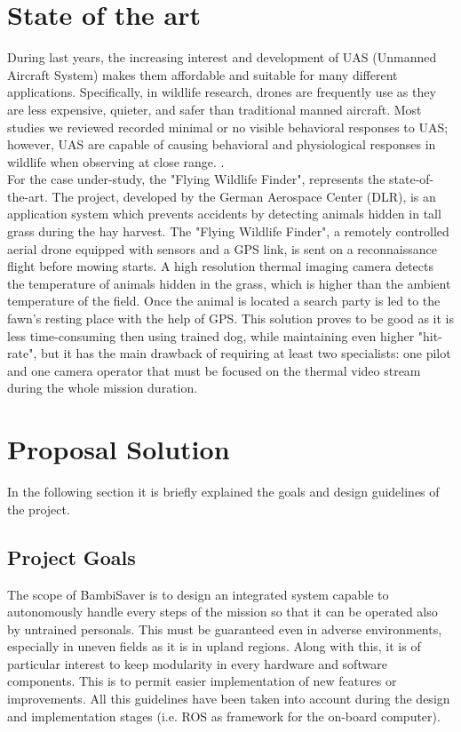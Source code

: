 \section{State of the art} %
\label{sec:state_of_the_art}
 During last years, the increasing interest and development of UAS (Unmanned Aircraft System) makes them affordable and suitable for many different applications. Specifically, in wildlife research, drones are frequently use as they are less expensive, quieter, and safer than traditional manned aircraft. Most studies we reviewed recorded minimal or no visible behavioral responses to UAS; however, UAS are capable of causing behavioral and physiological responses in wildlife when observing at close range. \cite{doi:10.1002/fee.1281}.\\
 For the case under-study, the "Flying Wildlife Finder", represents the state-of-the-art.
 The project, developed by the German Aerospace Center (DLR), is an application system which prevents accidents by detecting animals hidden in tall grass during the hay harvest. 
 The "Flying Wildlife Finder", a remotely controlled aerial drone equipped with sensors and a GPS link, is sent on a reconnaissance flight before mowing starts. A high resolution thermal imaging camera detects the temperature of animals hidden in the grass, which is higher than the ambient temperature of the field. Once the animal is located a search party is led to the fawn’s resting place with the help of GPS.
 This solution proves to be good as it is less time-consuming then using trained dog, while maintaining even higher "hit-rate", but it has the main drawback of requiring at least two specialists: one pilot and one camera operator that must be focused on the thermal video stream during the whole mission duration.

 
 
 \section{Proposal Solution} %
 \label{sec:proposal_solution}
 In the following section it is briefly explained the goals and design guidelines of the project.

 \subsection{Project Goals} %
 \label{sec:bambisaver_goals}
 The scope of BambiSaver is to design an integrated system capable to autonomously handle every steps of the mission so that it can be operated also by untrained personals. This must be guaranteed even in adverse environments, especially in uneven fields as it is in upland regions. 
 Along with this, it is of particular interest to keep modularity in every hardware and software components. This is to permit easier implementation of new features or improvements.
 All this guidelines  have been taken into account during the design and implementation stages (i.e. ROS as framework for the on-board computer).

